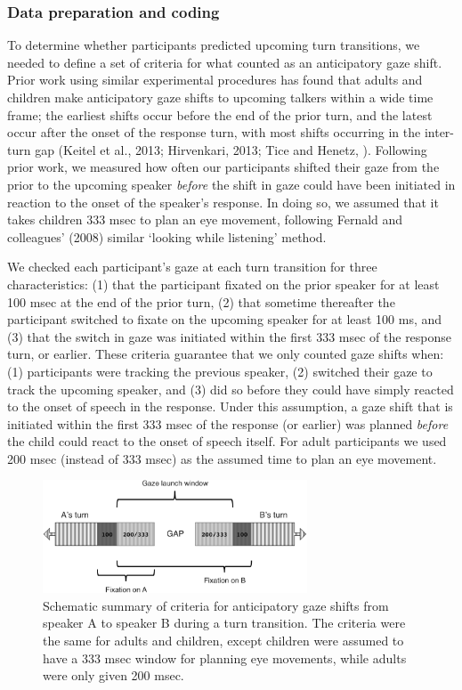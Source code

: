 \documentclass[authoryear, 12pt]{elsarticle}
\begin{document}
\subsubsection{Data preparation and coding}
To determine whether participants predicted upcoming turn transitions, we needed to define a set of criteria for what counted as an anticipatory gaze shift. Prior work using similar experimental procedures has found that adults and children make anticipatory gaze shifts to upcoming talkers within a wide time frame; the earliest shifts occur before the end of the prior turn, and the latest occur after the onset of the response turn, with most shifts occurring in the inter-turn gap (Keitel et al., 2013; Hirvenkari, 2013; Tice and Henetz, \citeyear{TiceHenetz11}). Following prior work, we measured how often our participants shifted their gaze from the prior to the upcoming speaker \textit{before} the shift in gaze could have been initiated in reaction to the onset of the speaker's response. In doing so, we assumed that it takes children 333 msec to plan an eye movement, following Fernald and colleagues' (2008) similar `looking while listening' method.

We checked each participant's gaze at each turn transition for three characteristics: (1) that the participant fixated on the prior speaker for at least 100 msec at the end of the prior turn, (2) that sometime thereafter the participant switched to fixate on the upcoming speaker for at least 100 ms, and (3) that the switch in gaze was initiated within the first 333 msec of the response turn, or earlier. These criteria guarantee that we only counted gaze shifts when: (1) participants were tracking the previous speaker, (2) switched their gaze to track the upcoming speaker, and (3) did so before they could have simply reacted to the onset of speech in the response. Under this assumption, a gaze shift that is initiated within the first 333 msec of the response (or earlier) was planned \textit{before} the child could react to the onset of speech itself. For adult participants we used 200 msec (instead of 333 msec) as the assumed time to plan an eye movement.

\begin{figure}[ht]
\begin{center}
\includegraphics[width=0.7\textwidth]{figures/FIG-AnticipCriteria.png}
\end{center}
\caption{Schematic summary of criteria for anticipatory gaze shifts from speaker A to speaker B during a turn transition. The criteria were the same for adults and children, except children were assumed to have a 333 msec window for planning eye movements, while adults were only given 200 msec.} 
\label{speakers}
\end{figure}
\end{document}

